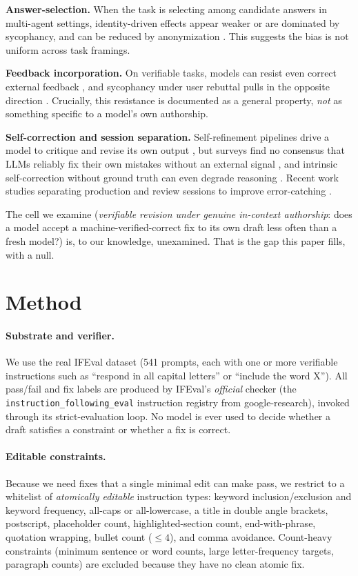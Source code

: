 \documentclass[11pt]{article}
\begin{document}
\textbf{Answer-selection.} When the task is selecting among candidate answers in multi-agent
settings, identity-driven effects appear weaker or are dominated by sycophancy, and can be
reduced by anonymization \citep{choi2026identity}. This suggests the bias is not uniform across
task framings.

\textbf{Feedback incorporation.} On verifiable tasks, models can resist even correct external
feedback \citep{jiang2025feedback}, and sycophancy under user rebuttal pulls in the opposite
direction \citep{kim2025challenging}. Crucially, this resistance is documented as a general
property, \emph{not} as something specific to a model's own authorship.

\textbf{Self-correction and session separation.} Self-refinement pipelines drive a model to
critique and revise its own output \citep{madaan2023selfrefine}, but surveys find no consensus
that LLMs reliably fix their own mistakes without an external signal \citep{kamoi2024when}, and
intrinsic self-correction without ground truth can even degrade reasoning \citep{huang2024large}.
Recent work studies separating production and review sessions to improve error-catching
\citep{song2026crosscontext}.

The cell we examine (\emph{verifiable revision under genuine in-context authorship}: does a
model accept a machine-verified-correct fix to its own draft less often than a fresh model?)
is, to our knowledge, unexamined. That is the gap this paper fills, with a null.

\section{Method}
\label{sec:method}

\paragraph{Substrate and verifier.} We use the real IFEval dataset \citep{zhou2023instruction}
(541 prompts, each with one or more verifiable instructions such as ``respond in all capital
letters'' or ``include the word X''). All pass/fail and fix labels are produced by IFEval's
\emph{official} checker (the \texttt{instruction\_following\_eval} instruction registry from
google-research), invoked through its strict-evaluation loop. No model is ever used to decide
whether a draft satisfies a constraint or whether a fix is correct.

\paragraph{Editable constraints.} Because we need fixes that a single minimal edit can make
pass, we restrict to a whitelist of \emph{atomically editable} instruction types: keyword
inclusion/exclusion and keyword frequency, all-caps or all-lowercase, a title in
double angle brackets, postscript, placeholder count, highlighted-section count, end-with-phrase,
quotation wrapping, bullet count ($\le 4$), and comma avoidance. Count-heavy constraints
(minimum sentence or word counts, large letter-frequency targets, paragraph counts) are
excluded because they have no clean atomic fix.
\end{document}
